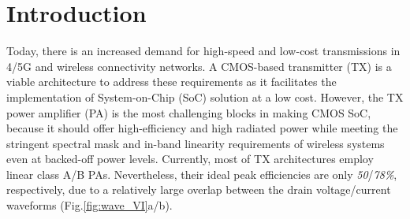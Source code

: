 \documentclass[conference]{IEEEtran}
\begin{document}
\IEEEpeerreviewmaketitle

\section{Introduction}
Today, there is an increased demand for high-speed and low-cost transmissions in 4/5G and wireless connectivity networks. A CMOS-based transmitter (TX) is a viable architecture to address these requirements as it facilitates the implementation of System-on-Chip (SoC) solution at a low cost. However, the TX power amplifier (PA) is the most challenging blocks in making CMOS SoC, because it should offer high-efficiency \color{green} and high radiated power \color{black} while meeting the stringent spectral mask  and in-band linearity requirements of wireless systems even at backed-off power levels. Currently, most of TX architectures employ linear class A/B PAs. Nevertheless, their ideal  peak efficiencies are only \textit{50}/\textit{78\%}, respectively, due to a \color{green} relatively \color{black} large overlap between the drain voltage/current  waveforms (Fig.\ref{fig:wave_VI}a/b).
\end{document}
